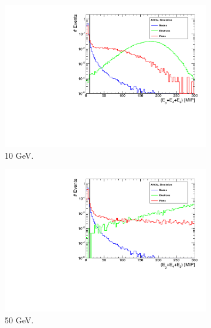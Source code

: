 \begin{figure}[htbp!]
	\begin{subfigure}[t]{0.5\textwidth}
		\centering
		\includegraphics[width=1\linewidth]{chap5/fig_AHCAL_timing/Electrons/SelectionCut_EnergyE3_10GeV}
		\caption{10 GeV.} \label{fig:e10GeV_E3}
	\end{subfigure}
	\hfill
	\begin{subfigure}[t]{0.5\textwidth}
		\centering
		\includegraphics[width=1\linewidth]{chap5/fig_AHCAL_timing/Electrons/SelectionCut_EnergyE3_50GeV}
		\caption{50 GeV.} \label{fig:e50GeV_E3}
	\end{subfigure}
	\hfill
	\begin{subfigure}[t]{0.5\textwidth}
		\centering

\end{subfigure}
\end{figure}
